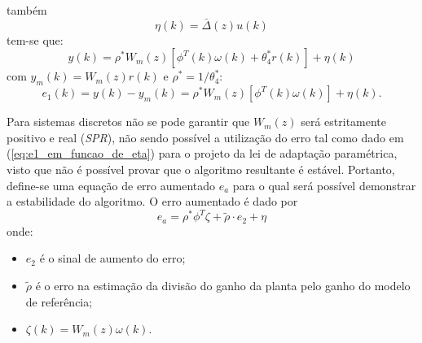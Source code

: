   também
  \begin{equation*}
    \eta(k) = \bar{\Delta}(z) u(k)
  \end{equation*}
  tem-se que:
  \begin{equation*}
    y(k) = \rho^* W_m(z) \left[ \phi^T(k) \omega(k) + \theta_4^* r(k)\right] + \eta(k)
  \end{equation*}
  com $y_m(k) = W_m(z) r(k)$ e $\rho^* = 1/\theta_4^*$:
  \begin{equation}
    e_1(k) = y(k) - y_m(k) = \rho^* W_m(z) \left[ \phi^T(k) \omega(k) \right] + \eta(k) \text{.}
    \label{eq:e1_em_funcao_de_eta}
  \end{equation}

  Para sistemas discretos não se pode garantir que $W_m(z)$ será estritamente positivo e real (\emph{SPR}), não sendo possível a utilização do erro tal como dado em (\ref{eq:e1_em_funcao_de_eta}) para o projeto da lei de adaptação paramétrica, visto que não é possível provar que o algoritmo resultante é estável. Portanto, define-se uma equação de erro aumentado $e_a$ para o qual será possível demonstrar a estabilidade do algoritmo. O erro aumentado é dado por
  \begin{equation}
    e_a = \rho^* \phi^T \zeta + \tilde{\rho} \cdot e_2 + \eta
    \label{eq:ea_erro_aumentado}
  \end{equation}
  onde:
  \begin{itemize}[leftmargin=+2cm]
    \item[] $e_2$ é o sinal de aumento do erro;
    \item[] $\tilde{\rho}$ é o erro na estimação da divisão do ganho da planta pelo ganho do modelo de referência;
    \item[] $\zeta(k) = W_m(z) \omega(k) \text{.}$
  \end{itemize}

